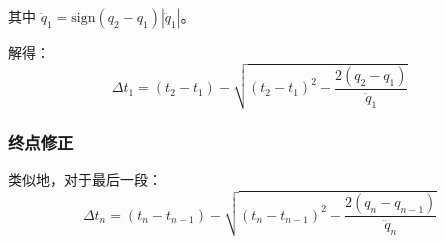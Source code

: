 \documentclass[12pt,a4paper]{article}
\begin{document}
其中 $\ddot{q}_1 = \text{sign}(q_2 - q_1)|\ddot{q}_1|$。

解得：
\begin{equation}
\boxed{
\Delta t_1 = (t_2 - t_1) - \sqrt{(t_2 - t_1)^2 - \frac{2(q_2 - q_1)}{\ddot{q}_1}}
}
\label{eq:delta_t1}
\end{equation}

\subsubsection{终点修正}

类似地，对于最后一段：
\begin{equation}
\boxed{
\Delta t_n = (t_n - t_{n-1}) - \sqrt{(t_n - t_{n-1})^2 - \frac{2(q_n - q_{n-1})}{\ddot{q}_n}}
}
\label{eq:delta_tn}
\end{equation}
\end{document}
